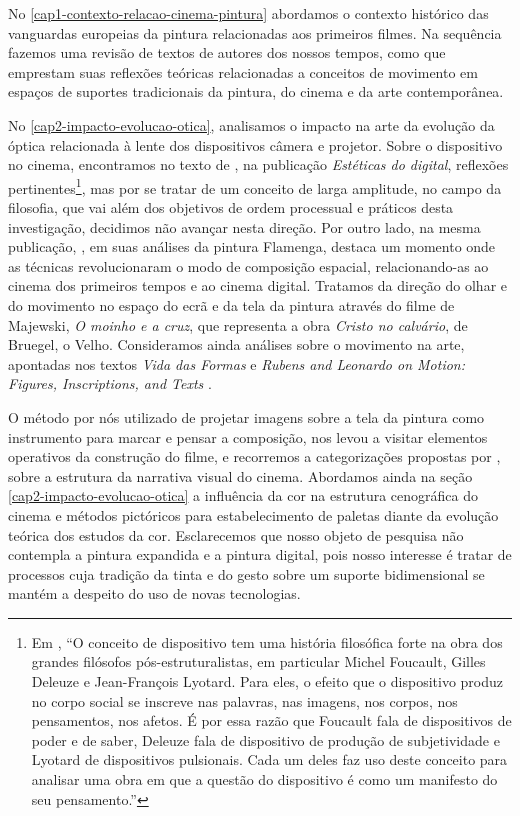 No \cref{cap1-contexto-relacao-cinema-pintura} abordamos o contexto
histórico das vanguardas europeias da pintura relacionadas aos
primeiros filmes. Na sequência fazemos uma revisão de textos de autores
dos nossos tempos, como \textcite{aumont2004olho,gardies2019espaco,sardo2017exercicio}
que emprestam suas reflexões teóricas relacionadas
a conceitos de movimento em espaços de suportes tradicionais da
pintura, do cinema e da arte contemporânea.

No \cref{cap2-impacto-evolucao-otica}, analisamos o impacto na arte da
evolução da óptica relacionada à lente dos dispositivos câmera e
projetor. Sobre o dispositivo no cinema, encontramos no texto de 
\textcite{parente2007cinema}, na publicação \emph{Estéticas do digital}, reflexões
pertinentes\footnote{Em \textcite[10]{parente2007cinema}, \enquote{O
		conceito de dispositivo tem uma história filosófica forte na obra dos
		grandes filósofos pós-estruturalistas, em particular Michel Foucault,
		Gilles Deleuze e Jean-François Lyotard. Para eles, o efeito que o
		dispositivo produz no corpo social se inscreve nas palavras, nas
		imagens, nos corpos, nos pensamentos, nos afetos. É por essa razão que
		Foucault fala de dispositivos de poder e de saber, Deleuze fala de
		dispositivo de produção de subjetividade e Lyotard de dispositivos
		pulsionais. Cada um deles faz uso deste conceito para analisar uma obra
		em que a questão do dispositivo é como um manifesto do seu pensamento.}%
}, mas por se tratar de um conceito de larga amplitude, no campo da
filosofia, que vai além dos objetivos de ordem processual e práticos
desta investigação, decidimos não avançar nesta direção. Por outro
lado, na mesma publicação, \textcite{viveiros2007espacos}, em suas
análises da pintura Flamenga, destaca um momento onde as técnicas
revolucionaram o modo de composição espacial, relacionando-as ao cinema
dos primeiros tempos e ao cinema digital. Tratamos da direção do olhar
e do movimento no espaço do ecrã e da tela da pintura através do filme
de Majewski, \emph{O moinho e a cruz}, que representa a obra
\emph{Cristo no calvário}, de Bruegel, o Velho. Consideramos ainda
análises sobre o movimento na arte, apontadas nos textos \emph{Vida das
	Formas}
\parencite{focillon1983vida} e \emph{Rubens and Leonardo on Motion:
	Figures, Inscriptions, and Texts} \parencite{barone2009rubens}.

O método por nós utilizado de projetar imagens sobre a tela da pintura
como instrumento para marcar e pensar a composição, nos levou a visitar
elementos operativos da construção do filme, e recorremos a
categorizações propostas por \textcite{block2021visual}, sobre a
estrutura da narrativa visual do cinema. Abordamos ainda na seção
\cref{cap2-impacto-evolucao-otica} a influência da cor na estrutura
cenográfica do cinema e métodos pictóricos para estabelecimento de
paletas diante da evolução teórica dos estudos da cor. Esclarecemos que
nosso objeto de pesquisa não contempla a pintura expandida e a pintura
digital, pois nosso interesse é tratar de processos cuja tradição da
tinta e do gesto sobre um suporte bidimensional se mantém a despeito do
uso de novas tecnologias.


